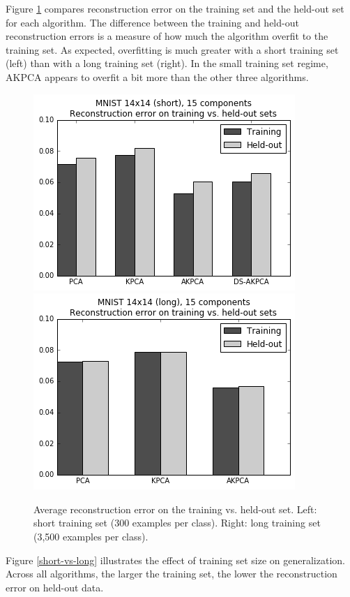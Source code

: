 \documentclass[]{article}
\begin{document}
Figure \ref{training-vs-test} compares reconstruction error on the training set and the held-out set for each algorithm.
The difference between the training and held-out reconstruction errors is a measure of how much the algorithm overfit to the training set.
As expected, overfitting is much greater with a short training set (left) than with a long training set (right).
In the small training set regime, AKPCA appears to overfit a bit more than the other three algorithms.

\begin{figure}[!ht]
\begin{center}
\includegraphics[scale=0.5]{figures/mnist_14_short_training_testing}
\includegraphics[scale=0.5]{figures/mnist_14_long_training_testing}
\caption{Average reconstruction error on the training vs. held-out set.  Left: short training set (300 examples per class).  Right: long training set (3,500 examples per class).}
\label{training-vs-test}
\end{center}
\end{figure}

Figure \ref{short-vs-long} illustrates the effect of training set size on generalization.
Across all algorithms, the larger the training set, the lower the reconstruction error on held-out data.
\end{document}
